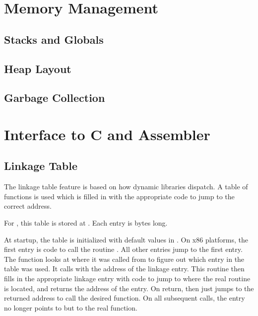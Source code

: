 \chapter{Memory Management}

\section{Stacks and Globals}

\section{Heap Layout}

\section{Garbage Collection}

\chapter{Interface to C and Assembler}


\section{Linkage Table}

The linkage table feature is based on how dynamic libraries dispatch.
A table of functions is used which is filled in with the appropriate
code to jump to the correct address.

For \cmucl{}, this table is stored at
. Each entry is
 bytes long.

At startup, the table is initialized with default values in
. On x86 platforms, the first entry is
code to call the routine . All other
entries jump to the first entry. The function
 looks at where it was called from to
figure out which entry in the table was used. It calls
 with the address of the linkage entry.
This routine then fills in the appropriate linkage entry with code to
jump to where the real routine is located, and returns the address of
the entry. On return,  then just jumps to
the returned address to call the desired function. On all subsequent
calls, the entry no longer points to  but
to the real function.

